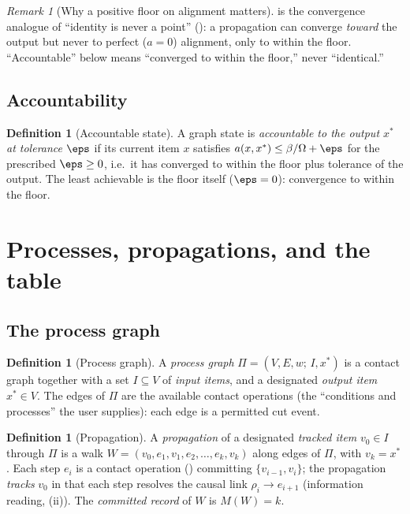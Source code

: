 \documentclass[11pt,a4paper]{article}
\theoremstyle{thmstyle}
\theoremstyle{definition}
\newtheorem{definition}[theorem]{Definition}
\theoremstyle{remark}
\newtheorem{remark}[theorem]{Remark}
\newcommand{\V}{V}
\newcommand{\E}{E}
\newcommand{\wt}{w}
\newcommand{\flo}{\beta}                 %
\newcommand{\rec}{M}                     %
\newcommand{\res}{\rho}                  %
\newcommand{\Proc}{\Pi}                  %
\begin{document}
\begin{remark}[Why a positive floor on alignment matters]
\label{rem:align-floor}
 is the convergence analogue of ``identity is never
a point'' (): a propagation can converge \emph{toward} the
output but never to perfect ($a=0$) alignment, only to within the floor.
``Accountable'' below means ``converged to within the floor,'' never
``identical.''
\end{remark}

\subsection{Accountability}

\begin{definition}[Accountable state]
\label{def:accountable}
A graph state is \emph{accountable to the output $x^{\ast}$ at tolerance
$\eps$} if its current item $x$ satisfies $a(x,x^{\ast})\le\flo/\Omega+\eps$
for the prescribed $\eps\ge0$, i.e.\ it has converged to within the floor
plus tolerance of the output. The least achievable is the floor itself
($\eps=0$): convergence to within the floor.
\end{definition}

\section{Processes, propagations, and the table}
\label{sec:table}

\subsection{The process graph}

\begin{definition}[Process graph]
\label{def:process-graph}
A \emph{process graph} $\Proc=(\V,\E,\wt;\,I,x^{\ast})$ is a contact graph
together with a set $I\subseteq\V$ of \emph{input items}, and a designated
\emph{output item} $x^{\ast}\in\V$. The edges of $\Proc$ are the available
contact operations (the ``conditions and processes'' the user supplies):
each edge is a permitted cut event.
\end{definition}

\begin{definition}[Propagation]
\label{def:propagation}
A \emph{propagation} of a designated \emph{tracked item} $v_0\in I$ through
$\Proc$ is a walk $W=(v_0,e_1,v_1,e_2,\dots,e_k,v_k)$ along edges of
$\Proc$, with $v_k=x^{\ast}$. Each step $e_i$ is a contact operation
() committing $\{v_{i-1},v_i\}$; the propagation
\emph{tracks} $v_0$ in that each step resolves the causal link
$\res_i\to e_{i+1}$ (information reading, (ii)).
The \emph{committed record} of $W$ is $\rec(W)=k$.
\end{definition}
\end{document}
